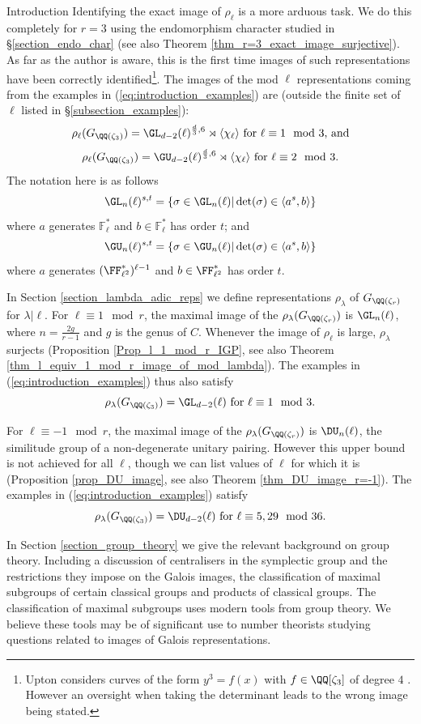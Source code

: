 \documentclass[11pt,a4paper]{article}
\newcommand{\Fl}{\mathbb{F}_\ell}
\newcommand{\Gcyclo}[1]{G_{\QQ(\zeta_{#1})}}
\newcommand{\GQr}{G_{\QQ(\zeta_{r})}}
\begin{document}
\begin{section}{Introduction}
Identifying the exact image of $\rho_\ell$ is a more arduous task. We do this completely for $r=3$ using the endomorphism character studied in \S \ref{section_endo_char} (see also Theorem \ref{thm_r=3_exact_image_surjective}).
As far as the author is aware, this is the first time images of such representations have been correctly identified\footnote{Upton considers curves of the form $y^3=f(x)$ with $f \in \QQ[\zeta_3]$ of degree $4$ \cite{Upton}. However an oversight when taking the determinant leads to the wrong image being stated.}. 
The images of the mod $\ell$ representations coming from the examples in (\ref{eq:introduction_examples})  are (outside the finite set of $\ell$ listed in \S \ref{subsection_examples}):
\[\rho_\ell(\Gcyclo{3}) = \GL_{d-2}(\ell)^{\frac{d}{3},6} \rtimes \langle \chi_\ell \rangle \text{ for $\ell \equiv 1 \mod{3}$, and}
\]
\[\rho_\ell(\Gcyclo{3}) = \GU_{d-2}(\ell)^{\frac{d}{3},6} \rtimes \langle \chi_\ell \rangle \text{ for $\ell \equiv 2 \mod{3}$.}
\]
The notation here is as follows
\[\GL_n(\ell)^{s, t} = \{\sigma \in \GL_n(\ell)| \det(\sigma) \in \langle a^s,b\rangle \}\] where $a$ generates $\Fl^*$ and $b \in \Fl^*$ has order $t$; and
\[\GU_n(\ell)^{s,t} =
\{ \sigma \in \GU_n(\ell)| \det(\sigma) \in \langle a^s,b\rangle \}\] where $a$ generates $(\FF_{\ell^2}^*)^{\ell-1}$ and $b \in \FF_{\ell^2}^*$ has order $t$.

In Section \ref{section_lambda_adic_reps} we define representations $\rho_\lambda$ of $\GQr$ for $\lambda| \ell$.
For $\ell \equiv 1 \mod{r}$, the maximal image of the $\rho_\lambda(\GQr)$ is $\GL_n(\ell)$, where $n = \frac{2g}{r-1}$ and $g$ is the genus of $C$.
Whenever the image of $\rho_\ell$ is large,  $\rho_\lambda$ surjects (Proposition \ref{Prop_l_1_mod_r_IGP}, see also Theorem \ref{thm_l_equiv_1_mod_r_image_of_mod_lambda}).
The examples in (\ref{eq:introduction_examples}) thus also satisfy
\[\rho_\lambda(\Gcyclo{3}) = \GL_{d-2}(\ell)  \text{ for $\ell \equiv 1 \mod{3}$.}\]

For $\ell \equiv -1 \mod{r}$, the maximal image of the $\rho_\lambda(\GQr)$ is $\DU_n(\ell)$, the similitude group of a non-degenerate unitary pairing. However this upper bound is not achieved for all $\ell$, though we can list values of $\ell$ for which it is (Proposition \ref{prop_DU_image}, see also Theorem \ref{thm_DU_image_r=-1}).
The examples in (\ref{eq:introduction_examples}) satisfy
\[\rho_\lambda(\Gcyclo{3})=\DU_{d-2}(\ell) \text{ for $\ell \equiv 5,29 \mod{36}$.}\]

In Section \ref{section_group_theory} we give the relevant background on group theory.
Including a discussion of centralisers in the symplectic group and the restrictions they impose on the Galois images, the classification of maximal subgroups of certain classical groups and products of classical groups.
The classification of maximal subgroups uses modern tools from group theory.
We believe these tools may be of significant use to number theorists studying questions related to images of Galois representations.


\end{section}
\end{document}
